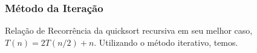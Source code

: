 \subsubsection{Método da Iteração}
Relação de Recorrência da quicksort recursiva em seu melhor caso, $T(n) = 2T(n/2) + n$. Utilizando o método iterativo, temos.
